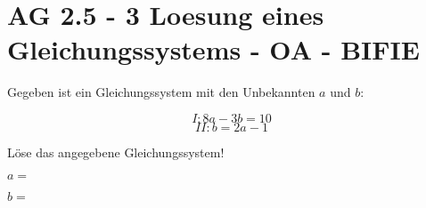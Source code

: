 \section{AG 2.5 - 3 Loesung eines Gleichungssystems - OA - BIFIE}

\begin{beispiel}[AG 2.5]{1} %
		Gegeben ist ein Gleichungssystem mit den Unbekannten $a$ und $b$:
		
	\[I : 8a-3b = 10  \]
	\[ II : b = 2a -1\]
		
		
		
\leer

Löse das angegebene Gleichungssystem!

\leer

$a=$ 
\leer

$b=$ 	
\end{beispiel}